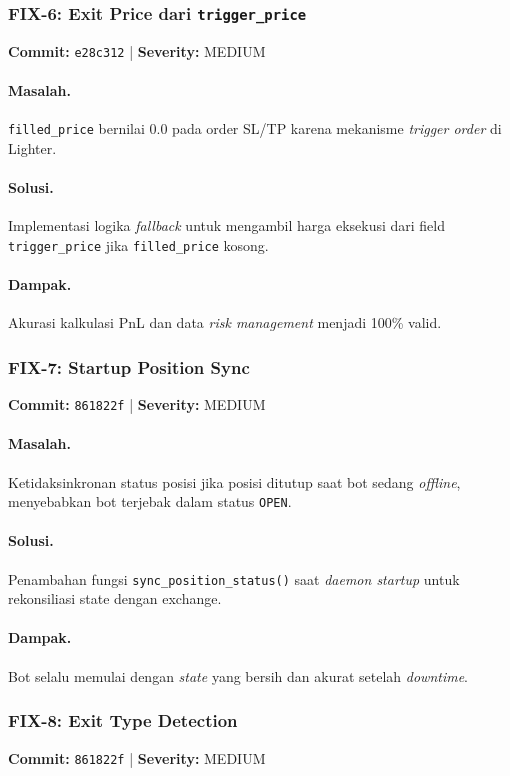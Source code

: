 \documentclass[10pt,a4paper]{article}
\begin{document}
\subsubsection{FIX-6: Exit Price dari \texttt{trigger\_price}}
\textbf{Commit:} \texttt{e28c312} | \textbf{Severity:} MEDIUM

\paragraph{Masalah.} \texttt{filled\_price} bernilai 0.0 pada order SL/TP karena mekanisme \textit{trigger order} di Lighter.
\paragraph{Solusi.} Implementasi logika \textit{fallback} untuk mengambil harga eksekusi dari field \texttt{trigger\_price} jika \texttt{filled\_price} kosong.
\paragraph{Dampak.} Akurasi kalkulasi PnL dan data \textit{risk management} menjadi 100\% valid.

\subsubsection{FIX-7: Startup Position Sync}
\textbf{Commit:} \texttt{861822f} | \textbf{Severity:} MEDIUM

\paragraph{Masalah.} Ketidaksinkronan status posisi jika posisi ditutup saat bot sedang \textit{offline}, menyebabkan bot terjebak dalam status \texttt{OPEN}.
\paragraph{Solusi.} Penambahan fungsi \texttt{sync\_position\_status()} saat \textit{daemon startup} untuk rekonsiliasi state dengan exchange.
\paragraph{Dampak.} Bot selalu memulai dengan \textit{state} yang bersih dan akurat setelah \textit{downtime}.

\subsubsection{FIX-8: Exit Type Detection}
\textbf{Commit:} \texttt{861822f} | \textbf{Severity:} MEDIUM
\end{document}

